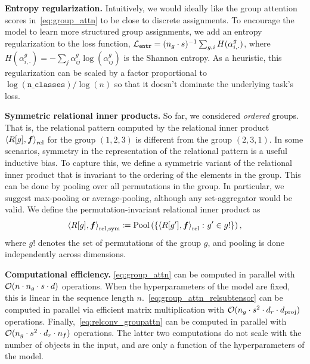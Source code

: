 \textbf{Entropy regularization.} Intuitively, we would ideally like the group attention scores in~\cref{eq:group_attn} to be close to discrete assignments. 
To encourage the model to learn more structured group assignments, we add an entropy regularization to the loss function, ${\mathcal{L}}_{\mathtt{entr}} = (n_g \cdot s)^{-1} \sum_{g, i} H(\alpha_{i,\cdot}^{g})$, where $H(\alpha_{i,\cdot}^{g}) = - \sum_{j} \alpha_{ij}^{g} \log(\alpha_{ij}^g)$ is the Shannon entropy. As a heuristic, this regularization can be scaled by a factor proportional to $\log(\mathtt{n\_classes}) / \log(n)$ so that it doesn't dominate the underlying task's loss.

\textbf{Symmetric relational inner products.} So far, we considered \textit{ordered} groups. That is, the relational pattern computed by the relational inner product $\left\langle R[g], \bm{f} \right\rangle_\mathrm{rel}$ for the group $(1, 2, 3)$ is different from the group $(2, 3, 1)$. In some scenarios, symmetry in the representation of the relational pattern is a useful inductive bias. To capture this, we define a symmetric variant of the relational inner product that is invariant to the ordering of the elements in the group. This can be done by pooling over all permutations in the group. In particular, we suggest max-pooling or average-pooling, although any set-aggregator would be valid. We define the permutation-invariant relational inner product as
\begin{equation}\label{eq:symmetric_relational_inner_prod}
    \left \langle R[g], \bm{f} \right\rangle_{\mathrm{rel}, \mathrm{sym}} \coloneq \mathrm{Pool}\left(\left\{\left\langle R[g'], \bm{f} \right\rangle_\mathrm{rel} \colon g' \in g!\right\}\right),
\end{equation}
where $g!$ denotes the set of permutations of the group $g$, and pooling is done independently across dimensions.


\textbf{Computational efficiency.} \cref{eq:group_attn} can be computed in parallel with ${\mathcal{O}}(n \cdot n_g \cdot s \cdot d)$ operations. When the hyperparameters of the model are fixed, this is linear in the sequence length $n$.~\cref{eq:group_attn_relsubtensor} can be computed in parallel via efficient matrix multiplication with ${\mathcal{O}}(n_g \cdot s^2 \cdot d_r \cdot d_{\mathrm{proj}})$ operations. Finally,~\cref{eq:relconv_groupattn} can be computed in parallel with ${\mathcal{O}}(n_g \cdot s^2 \cdot d_r \cdot n_f)$ operations. The latter two computations do not scale with the number of objects in the input, and are only a function of the hyperparameters of the model.
